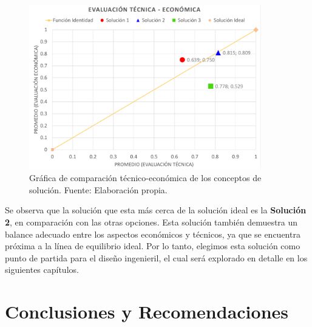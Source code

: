 \begin{figure}[H]
	\centering
	\includegraphics[width=0.9\textwidth]{img/comp_tecnico_economica.pdf}
	\caption[Gráfica de comparación técnico-económica de los conceptos de solución.]{Gráfica de comparación técnico-económica de los conceptos de solución. Fuente: Elaboración propia.}
	\label{fig:comp_tecnico_economica}
\end{figure}

Se observa que la solución que esta más cerca de la solución ideal es la \textbf{Solución 2}, en comparación con las otras opciones. Esta solución también demuestra un balance adecuado entre los aspectos económicos y técnicos, ya que se encuentra próxima a la línea de equilibrio ideal. Por lo tanto, elegimos esta solución como punto de partida para el diseño ingenieril, el cual será explorado en detalle en los siguientes capítulos.

\chapter*{Conclusiones y Recomendaciones}



